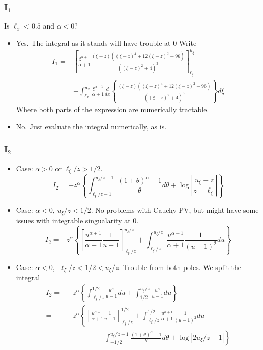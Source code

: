 \documentclass{article}
\begin{document}
\subsubsection*{I$_1$}
Is $\ell_x < 0.5$ and $\alpha < 0$?
\begin{itemize}
\item Yes. The integral as it stands will have trouble at $0$ Write
\begin{align*}
 I_1 =& \left[ \frac{\xi^{\alpha+1}}{\alpha+1}
\frac{(\xi-z)((\xi-z)^4+12(\xi-z)^2-96)}{( (\xi-z)^2 + 4)^3}
\right]_{\ell_\xi}^{u_\xi} \\
& - \int_{\ell_x}^{u_x} \frac{\xi^{\alpha+1}}{\alpha+1} \frac{d}{dx}
\left\{ \frac{(\xi-z)((\xi-z)^4+12(\xi-z)^2-96)}{( (\xi-z)^2 + 4)^3}
\right\} d\xi \end{align*}
Where both parts of the expression are numerically tractable.
\item No. Just evaluate the integral numerically, as is.
\end{itemize}
\subsubsection*{I$_2$}
\begin{itemize}
\item Case: $\alpha > 0$ or $\ell_\xi/z > 1/2$. 
\\
\[ I_2 = - z^{\alpha} \left\{ \int_{\ell_\xi/z-1}^{u_\xi/z -1} 
\frac{(1+\theta)^{\alpha} -1}{\theta} d\theta + \log \left| 
\frac{u_\xi - z}{z - \ell_\xi} \right| \right\} \]
\item Case: $\alpha < 0$, $u_\xi/z < 1/2$. No problems with Cauchy PV,
but might have some issues with integrable singualarity at 0.
\[ I_2 = - z^{\alpha} \left\{ \left[ \frac{u^{\alpha+1}}{\alpha+1} 
\frac{1}{u-1} \right]_{\ell_\xi/z}^{u_\xi/z} + \int_{\ell_\xi/z}^{u_\xi/z}
\frac{u^{\alpha+1}}{\alpha+1} 
\frac{1}{(u-1)^2} du \right\}\]
\item Case: $\alpha < 0$,  $\; \ell_\xi/z < 1/2 < u_\xi/z$. Trouble from
both poles. We split the integral
\begin{align*} I_2 =& -z^{\alpha} \left\{ 
\int_{\ell_\xi/z}^{1/2} \frac{u^{\alpha}}{u-1} du  + 
\int_{1/2}^{u_\xi/z} \frac{u^{\alpha}}{u-1} du 
\right\}  \\
= & -z^{\alpha} \left\{ \left[ \frac{u^{\alpha+1}}{\alpha+1} 
\frac{1}{u-1} \right]_{\ell_\xi/z}^{1/2} + \int_{\ell_\xi/z}^{1/2}
\frac{u^{\alpha+1}}{\alpha+1} 
\frac{1}{(u-1)^2} du  \right. \\
& \qquad \qquad + \left. \int_{-1/2}^{u_\xi/z -1} 
\frac{(1+\theta)^{\alpha} -1}{\theta} d\theta + \log \left| 
2u_\xi/z - 1 \right| 
\right\} 
\end{align*}
\end{itemize}

%
%
%
%
%
%
\end{document}
